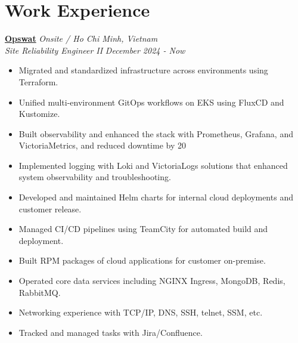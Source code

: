 \documentclass[11pt, a4paper]{article}
\begin{document}
\section{Work Experience}
{\large\textbf{\href{https://www.opswat.com/}{Opswat}}} \hfill {\small\textit{Onsite / Ho Chi Minh, Vietnam}} \\
\textit{Site Reliability Engineer II} \hfill {\small\textit{December 2024 - Now}}
\begin{itemize}[leftmargin=*]
    \item Migrated and standardized infrastructure across environments using Terraform.
    \item Unified multi-environment GitOps workflows on EKS using FluxCD and Kustomize.
    \item Built observability and enhanced the stack with Prometheus, Grafana, and VictoriaMetrics, and reduced downtime by 20%
    \item Implemented logging with Loki and VictoriaLogs solutions that enhanced system observability and troubleshooting.
    \item Developed and maintained Helm charts for internal cloud deployments and customer release.
    \item Managed CI/CD pipelines using TeamCity for automated build and deployment.
    \item Built RPM packages of cloud applications for customer on-premise.
    \item Operated core data services including NGINX Ingress, MongoDB, Redis, RabbitMQ.
    \item Networking experience with TCP/IP, DNS, SSH, telnet, SSM, etc.
    \item Tracked and managed tasks with Jira/Confluence.
\end{itemize}
\end{document}
